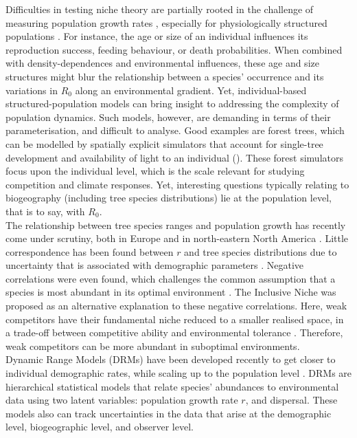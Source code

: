 Difficulties in testing niche theory are partially rooted in the challenge of measuring population growth rates \citep{McGill2012}, especially for physiologically structured populations \citep{Diekmann1990}. For instance, the age or size of an individual influences its reproduction success, feeding behaviour, or death probabilities. When combined with density-dependences and environmental influences, these age and size structures might blur the relationship between a species' occurrence and its variations in $ R_0 $ along an environmental gradient. Yet, individual-based structured-population models can bring insight to addressing the complexity of population dynamics. Such models, however, are demanding in terms of their parameterisation, and difficult to analyse. Good examples are forest trees, which can be modelled by spatially explicit simulators that account for single-tree development and availability of light to an individual (\eg \citet{Pacala1993}). These forest simulators focus upon the individual level, which is the scale relevant for studying competition and climate responses. Yet, interesting questions typically relating to biogeography (including tree species distributions) lie at the population level, that is to say, with $ R_0 $. \\

The relationship between tree species ranges and population growth has recently come under scrutiny, both in Europe \citep{Thuiller2014} and in north-eastern North America \citep{McGill2012}. Little correspondence has been found between $ r $ and tree species distributions due to uncertainty that is associated with demographic parameters \citep{Thuiller2014}. Negative correlations were even found, which challenges the common assumption that a species is most abundant in its optimal environment \citep{McGill2012}. The Inclusive Niche was proposed as an alternative explanation to these negative correlations. Here, weak competitors have their fundamental niche reduced to a smaller realised space, in a trade-off between competitive ability and environmental tolerance \citep{Serrano2015}. Therefore, weak competitors can be more abundant in suboptimal environments. \\

Dynamic Range Models (DRMs) have been developed recently to get closer to individual demographic rates, while scaling up to the population level \citep{Pagel2012}. DRMs are hierarchical statistical models that relate species' abundances to environmental data using two latent variables: population growth rate $ r $, and dispersal. These models also can track uncertainties in the data that arise at the demographic level, biogeographic level, and observer level. \\

